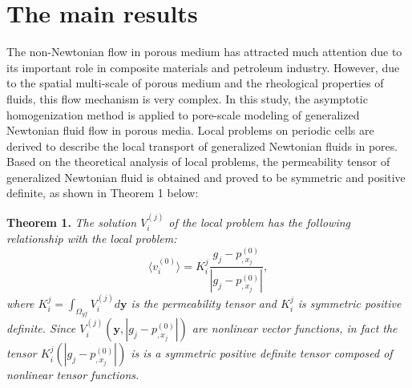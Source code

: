 \documentclass[12pt]{llncs}
\begin{document}
\section{The main results}


The non-Newtonian flow in porous medium has attracted much attention due to its important role in composite materials and petroleum industry.
However, due to the spatial multi-scale of porous medium and the rheological properties of fluids, this flow mechanism is very complex.
In this study, the asymptotic homogenization method is applied to pore-scale modeling of generalized Newtonian fluid flow in porous media.
Local problems on periodic cells are derived to describe the local transport of generalized Newtonian fluids in pores.
Based on the theoretical analysis of local problems, the permeability tensor of generalized Newtonian fluid is obtained and proved to be symmetric and positive definite, as shown in Theorem 1 below:

\textbf{Theorem 1.}
\textsl{The solution $V_{i}^{(j)}$ of the local problem has the following
relationship with the local problem:
\begin{equation*}
\displaystyle \langle v_{i}^{(0)}\rangle = K_{i}^{j}
\frac{g_{j}-p_{,x_{j}}^{(0)}}{|g_{j}-p_{,x_{j}}^{(0)}|},
\end{equation*}
where $K_{i}^{j}=\int_{\Omega_{yf}}V_{i}^{(j)}d\mathbf{y}$ is the permeability tensor
and $K_{i}^{j}$ is symmetric positive definite.
Since $V_{i}^{(j)}(\mathbf{y},|g_{j}-p^{(0)}_{,x_{j}}|)$ are nonlinear vector functions,
in fact the tensor $K_{i}^{j}(|g_{j}-p^{(0)}_{,x_{j}}|)$ is is
a symmetric positive definite tensor composed of nonlinear tensor functions.}
\end{document}
